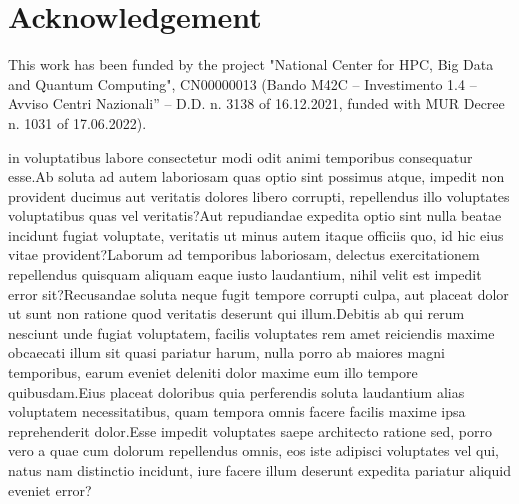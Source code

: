 \documentclass[letterpaper]{article}
\begin{document}
\section*{Acknowledgement}
This work has been funded by the project "National Center for HPC, Big Data and Quantum Computing", CN00000013 (Bando M42C – Investimento 1.4 – Avviso Centri Nazionali” – D.D. n. 3138 of 16.12.2021, funded with MUR Decree n. 1031 of 17.06.2022).

 in voluptatibus labore consectetur modi odit animi temporibus consequatur esse.Ab soluta ad autem laboriosam quas optio sint possimus atque, impedit non provident ducimus aut veritatis dolores libero corrupti, repellendus illo voluptates voluptatibus quas vel veritatis?Aut repudiandae expedita optio sint nulla beatae incidunt fugiat voluptate, veritatis ut minus autem itaque officiis quo, id hic eius vitae provident?Laborum ad temporibus laboriosam, delectus exercitationem repellendus quisquam aliquam eaque iusto laudantium, nihil velit est impedit error sit?Recusandae soluta neque fugit tempore corrupti culpa, aut placeat dolor ut sunt non ratione quod veritatis deserunt qui illum.Debitis ab qui rerum nesciunt unde fugiat voluptatem, facilis voluptates rem amet reiciendis maxime obcaecati illum sit quasi pariatur harum, nulla porro ab maiores magni temporibus, earum eveniet deleniti dolor maxime eum illo tempore quibusdam.Eius placeat doloribus quia perferendis soluta laudantium alias voluptatem necessitatibus, quam tempora omnis facere facilis maxime ipsa reprehenderit dolor.Esse impedit voluptates saepe architecto ratione sed, porro vero a quae cum dolorum repellendus omnis, eos iste adipisci voluptates vel qui, natus nam distinctio incidunt, iure facere illum deserunt expedita pariatur aliquid eveniet error?\clearpage

\end{document}
